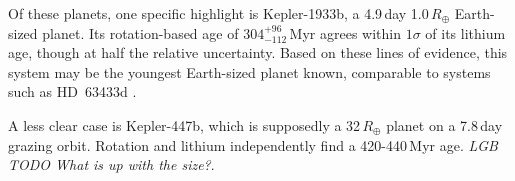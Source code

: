 \documentclass[11pt,twocolumn,tighten]{aastex63}
\begin{document}
Of these planets, one specific highlight is Kepler-1933b, a 4.9\,day
1.0\,$R_\oplus$ Earth-sized planet.  Its rotation-based age of
$304^{+96}_{-112}$\,Myr agrees within $1\sigma$ of its lithium age,
though at half the relative uncertainty.  Based on these lines of
evidence, this system may be the youngest Earth-sized planet known,
comparable to systems such as HD~63433d \citep[1.1\,$R_\oplus$,
$414\pm23$\,Myr][]{2024AJ....167...54C}.

A less clear case is Kepler-447b, which is supposedly a 32\,$R_\oplus$
planet on a 7.8\,day grazing orbit.  Rotation and lithium independently
find a 420-440\,Myr age.  {\it LGB TODO What is up with the size?}.

%  
%  
\end{document}
